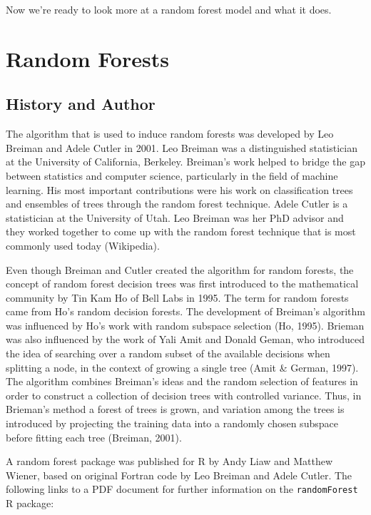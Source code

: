 \documentclass[12pt,twoside]{reedthesis}
\begin{document}
  Now we're ready to look more at a random forest model and what it does.
  
  \section{Random Forests}\label{random-forests}
  
  \subsection{History and Author}\label{history-and-author}
  
  The algorithm that is used to induce random forests was developed by Leo
  Breiman and Adele Cutler in 2001. Leo Breiman was a distinguished
  statistician at the University of California, Berkeley. Breiman's work
  helped to bridge the gap between statistics and computer science,
  particularly in the field of machine learning. His most important
  contributions were his work on classification trees and ensembles of
  trees through the random forest technique. Adele Cutler is a
  statistician at the University of Utah. Leo Breiman was her PhD advisor
  and they worked together to come up with the random forest technique
  that is most commonly used today (Wikipedia).
  
  Even though Breiman and Cutler created the algorithm for random forests,
  the concept of random forest decision trees was first introduced to the
  mathematical community by Tin Kam Ho of Bell Labs in 1995. The term for
  random forests came from Ho's random decision forests. The development
  of Breiman's algorithm was influenced by Ho's work with random subspace
  selection (Ho, 1995). Brieman was also influenced by the work of Yali
  Amit and Donald Geman, who introduced the idea of searching over a
  random subset of the available decisions when splitting a node, in the
  context of growing a single tree (Amit \& German, 1997). The algorithm
  combines Breiman's ideas and the random selection of features in order
  to construct a collection of decision trees with controlled variance.
  Thus, in Brieman's method a forest of trees is grown, and variation
  among the trees is introduced by projecting the training data into a
  randomly chosen subspace before fitting each tree (Breiman, 2001).
  
  A random forest package was published for R by Andy Liaw and Matthew
  Wiener, based on original Fortran code by Leo Breiman and Adele Cutler.
  The following links to a PDF document for further information on the
  \texttt{randomForest} R package:
  
\end{document}
